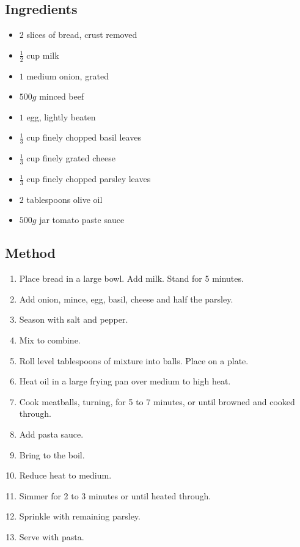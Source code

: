 \documentclass[11pt,a4paper]{article}
\begin{document}
\subsection*{Ingredients}

\begin{multicols}{2}

\begin{itemize}
  \item $ 2 $ slices of bread, crust removed
  \item $ \frac{1}{2} $  cup milk
  \item $ 1 $ medium onion, grated
  \item $ 500g $ minced beef
  \item $ 1 $ egg, lightly beaten
\end{itemize}

\columnbreak

\begin{itemize}
  \item $ \frac{1}{3} $ cup finely chopped basil leaves
  \item $ \frac{1}{3} $ cup finely grated cheese
  \item $ \frac{1}{3} $ cup finely chopped parsley leaves
  \item $ 2 $ tablespoons olive oil
  \item $ 500g $ jar tomato paste sauce
\end{itemize}

\end{multicols}

\medskip

\subsection*{Method}

\begin{enumerate}
  \item Place bread in a large bowl. Add milk. Stand for 5 minutes. 
  \item Add onion, mince, egg, basil, cheese and half the parsley. 
  \item Season with salt and pepper. 
  \item Mix to combine. 
  \item Roll level tablespoons of mixture into balls. Place on a plate.
  \item Heat oil in a large frying pan over medium to high heat. 
  \item Cook meatballs, turning, for 5 to 7 minutes, or until browned and cooked through. 
  \item Add pasta sauce. 
  \item Bring to the boil. 
  \item Reduce heat to medium. 
  \item Simmer for 2 to 3 minutes or until heated through. 
  \item Sprinkle with remaining parsley. 
  \item Serve with pasta.
\end{enumerate}
\end{document}
